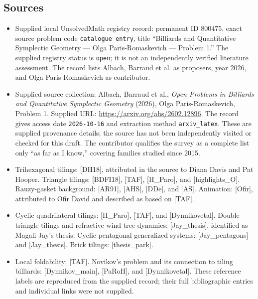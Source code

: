 \documentclass[11pt]{article}
\begin{document}
\subsection{Sources}
\begin{itemize}
\item Supplied local UnsolvedMath registry record: permanent ID \(800475\), exact source problem code \texttt{catalogue entry}, title ``Billiards and Quantitative Symplectic Geometry --- Olga Paris-Romaskevich --- Problem 1.'' The supplied registry status is \texttt{open}; it is not an independently verified literature assessment. The record lists Albach, Barraud et al. as proposers, year 2026, and Olga Paris-Romaskevich as contributor.
\item Supplied source collection: Albach, Barraud et al., \emph{Open Problems in Billiards and Quantitative Symplectic Geometry} (2026), Olga Paris-Romaskevich, Problem 1. Supplied URL: \url{https://arxiv.org/abs/2602.12896}. The record gives access date \texttt{2026-10-16} and extraction method \texttt{arxiv\_latex}. These are supplied provenance details; the source has not been independently visited or checked for this draft. The contributor qualifies the survey as a complete list only ``as far as I know,'' covering families studied since 2015.
\item Trihexagonal tilings: [DH18], attributed in the source to Diana Davis and Pat Hooper. Triangle tilings: [BDFI18], [TAF], [H\_Paro], and [highlights\_O]. Rauzy-gasket background: [AR91], [AHS], [DDe], and [AS]. Animation: [Ofir], attributed to Ofir David and described as based on [TAF].
\item Cyclic quadrilateral tilings: [H\_Paro], [TAF], and [Dynnikovetal]. Double triangle tilings and refractive wind-tree dynamics: [Jay\_thesis], identified as Magali Jay's thesis. Cyclic pentagonal generalized systems: [Jay\_pentagons] and [Jay\_thesis]. Brick tilings: [thesis\_park].
\item Local foldability: [TAF]. Novikov's problem and its connection to tiling billiards: [Dynnikov\_main], [PaRoH], and [Dynnikovetal]. These reference labels are reproduced from the supplied record; their full bibliographic entries and individual links were not supplied.
\end{itemize}
\end{document}
